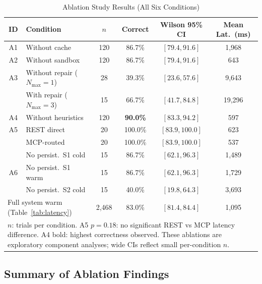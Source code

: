 \documentclass[conference]{IEEEtran}
\begin{document}
\begin{table}[htbp]
  \centering
  \caption{Ablation Study Results (All Six Conditions)}
  \label{tab:ablation}
  \renewcommand{\arraystretch}{1.2}
  \begin{tabular}{clcccc}
    \toprule
    \textbf{ID} & \textbf{Condition} & \textbf{$n$}
      & \textbf{Correct} & \textbf{Wilson 95\% CI} & \textbf{Mean Lat.\ (ms)} \\
    \midrule
    A1 & Without cache          & 120 & 86.7\% & $[79.4, 91.6]$ & 1{,}968 \\
    A2 & Without sandbox        & 120 & 86.7\% & $[79.4, 91.6]$ &   643 \\
    A3 & Without repair ($N_{\max}{=}1$) & 28  & 39.3\% & $[23.6, 57.6]$ & 9{,}643 \\
       & With repair ($N_{\max}{=}3$)    & 15  & 66.7\% & $[41.7, 84.8]$ & 19{,}296 \\
    A4 & Without heuristics     & 120 & \textbf{90.0\%} & $[83.3, 94.2]$ & 597 \\
    A5 & REST direct            &  20 & 100.0\% & $[83.9, 100.0]$ & 623 \\
       & MCP-routed             &  20 & 100.0\% & $[83.9, 100.0]$ & 537 \\
    \multirow{3}{*}{A6}
       & No persist.\ S1 cold   & 15  & 86.7\% & $[62.1, 96.3]$ & 1{,}489 \\
       & No persist.\ S1 warm   & 15  & 86.7\% & $[62.1, 96.3]$ & 1{,}729 \\
       & No persist.\ S2 cold   & 15  & 40.0\% & $[19.8, 64.3]$ & 3{,}693 \\
    \midrule
    \multicolumn{2}{l}{Full system warm (Table~\ref{tab:latency})}
      & 2{,}468 & 83.0\% & $[81.4, 84.4]$ & 1{,}095 \\
    \bottomrule
    \multicolumn{6}{l}{\parbox{\textwidth}{\footnotesize
      $n$: trials per condition.
      A5 $p=0.18$: no significant REST vs MCP latency difference.
      A4 bold: highest correctness observed.
      These ablations are exploratory component analyses;
      wide CIs reflect small per-condition $n$.}}
  \end{tabular}
\end{table}

\subsection{Summary of Ablation Findings}
\end{document}
